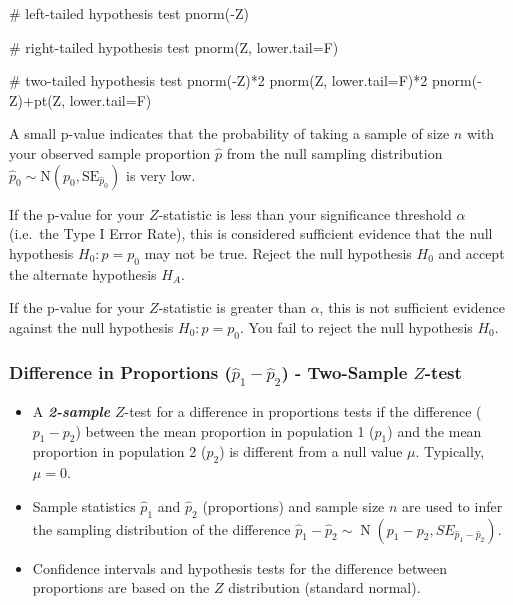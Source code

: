 \documentclass[
  letterpaper,
  DIV=11,
  numbers=noendperiod]{scrartcl}
\newenvironment{Shaded}{\begin{snugshade}}{\end{snugshade}}
\newcommand{\AttributeTok}[1]{\textcolor[rgb]{0.40,0.45,0.13}{#1}}
\newcommand{\CommentTok}[1]{\textcolor[rgb]{0.37,0.37,0.37}{#1}}
\newcommand{\DecValTok}[1]{\textcolor[rgb]{0.68,0.00,0.00}{#1}}
\newcommand{\FunctionTok}[1]{\textcolor[rgb]{0.28,0.35,0.67}{#1}}
\newcommand{\NormalTok}[1]{\textcolor[rgb]{0.00,0.23,0.31}{#1}}
\newcommand{\SpecialCharTok}[1]{\textcolor[rgb]{0.37,0.37,0.37}{#1}}
\begin{document}
\begin{Shaded}
\begin{Highlighting}[]
\CommentTok{\# left{-}tailed hypothesis test}
\FunctionTok{pnorm}\NormalTok{(}\SpecialCharTok{{-}}\NormalTok{Z)}

\CommentTok{\# right{-}tailed hypothesis test}
\FunctionTok{pnorm}\NormalTok{(Z, }\AttributeTok{lower.tail=}\NormalTok{F)}

\CommentTok{\# two{-}tailed hypothesis test}
\FunctionTok{pnorm}\NormalTok{(}\SpecialCharTok{{-}}\NormalTok{Z)}\SpecialCharTok{*}\DecValTok{2}
\FunctionTok{pnorm}\NormalTok{(Z, }\AttributeTok{lower.tail=}\NormalTok{F)}\SpecialCharTok{*}\DecValTok{2}
\FunctionTok{pnorm}\NormalTok{(}\SpecialCharTok{{-}}\NormalTok{Z)}\SpecialCharTok{+}\FunctionTok{pt}\NormalTok{(Z, }\AttributeTok{lower.tail=}\NormalTok{F)}
\end{Highlighting}
\end{Shaded}

A small p-value indicates that the probability of taking a sample of
size \(n\) with your observed sample proportion \(\hat{p}\) from the
null sampling distribution
\(\hat{p}_0 \sim \text{N}\left(p_0, \text{SE}_{\hat{p}_0}\right)\) is
very low.

If the p-value for your \(Z\)-statistic is less than your significance
threshold \(\alpha\) (i.e.~the Type I Error Rate), this is considered
sufficient evidence that the null hypothesis \(H_0 \colon p=p_0\) may
not be true. Reject the null hypothesis \(H_0\) and accept the alternate
hypothesis \(H_A\).

If the p-value for your \(Z\)-statistic is greater than \(\alpha\), this
is not sufficient evidence against the null hypothesis
\(H_0 \colon p=p_0\). You fail to reject the null hypothesis \(H_0\).

\subsubsection{\texorpdfstring{Difference in Proportions
(\(\hat{p}_1-\hat{p}_2\)) - Two-Sample
\(Z\)-test}{Difference in Proportions (\textbackslash hat\{p\}\_1-\textbackslash hat\{p\}\_2) - Two-Sample Z-test}}\label{difference-in-proportions-hatp_1-hatp_2---two-sample-z-test}

\begin{itemize}
\item
  A \textbf{\emph{2-sample}} \(Z\)-test for a difference in proportions
  tests if the difference (\(p_1-p_2\)) between the mean proportion in
  population 1 (\(p_1\)) and the mean proportion in population 2
  (\(p_2\)) is different from a null value \(\mu\). Typically,
  \(\mu=0\).
\item
  Sample statistics \(\hat{p}_1\) and \(\hat{p}_2\) (proportions) and
  sample size \(n\) are used to infer the sampling distribution of the
  difference
  \(\hat{p}_1-\hat{p}_2 \sim \operatorname{N}\left(p_1-p_2, SE_{\hat{p}_1-\hat{p}_2}\right)\).
\item
  Confidence intervals and hypothesis tests for the difference between
  proportions are based on the \(Z\) distribution (standard normal).
\end{itemize}
\end{document}
